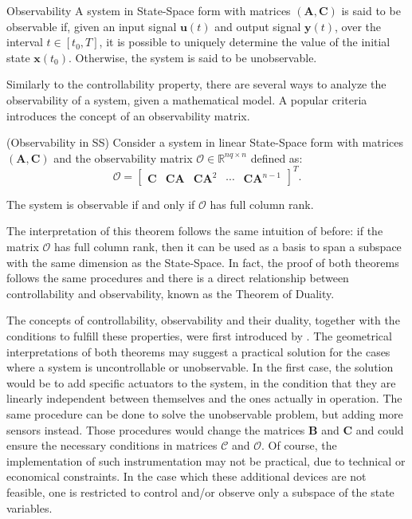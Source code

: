 \documentclass[a4paper,11pt]{book}
\numberwithin{figure}{chapter}
\numberwithin{equation}{chapter}
\numberwithin{table}{chapter}
\newtheorem{theorem}{Theorem}[chapter]
\theoremstyle{definition}
\newtheorem{definition}{Definition}[chapter]
\newcounter{boxed-theorem}
\newenvironment{boxed-theorem}[1]
{\colorlet{shadecolor}{pastelBlue2!5} \begin{shaded} \begin{theorem}{#1}}
{\end{theorem} \end{shaded}}
\newcounter{boxed-lemma}
\newcounter{boxed-definition}
\newenvironment{boxed-definition}[1]
{\colorlet{shadecolor}{pastelYellow!15} \begin{shaded} \begin{definition}{#1}}
{\end{definition} \end{shaded}}
\newcounter{boxed-example}
\begin{document}
\begin{boxed-definition}{Observability}
    A system in State-Space form with matrices $(\bm{A}, \bm{C})$ is said to be observable if, given an input signal $\bm{u}(t)$ and output signal $\bm{y}(t)$, over the interval $t \in [t_0, T]$, it is possible to uniquely determine the value of the initial state $\bm{x}(t_0)$. Otherwise, the system is said to be unobservable.
\end{boxed-definition}

Similarly to the controllability property, there are several ways to analyze the observability of a system, given a mathematical model. A popular criteria introduces the concept of an observability matrix.

\begin{boxed-theorem}{(Observability in SS)}
    Consider a system in linear State-Space form with matrices $(\bm{A}, \bm{C})$ and the observability matrix $\bm{\mathcal{O}} \in \mathbb{R}^{nq \times n}$ defined as:
    \begin{equation}
        \bm{\mathcal{O}} = \begin{bmatrix} \bm{C} & \bm{C} \bm{A} & \bm{C} \bm{A}^2 & \cdots & \bm{C} \bm{A}^{n-1} \end{bmatrix}^T
    .\end{equation}
    
    The system is observable if and only if $\bm{\mathcal{O}}$ has full column rank.
\end{boxed-theorem}   

The interpretation of this theorem follows the same intuition of before: if the matrix $\bm{\mathcal{O}}$ has full column rank, then it can be used as a basis to span a subspace with the same dimension as the State-Space. In fact, the proof of both theorems follows the same procedures and there is a direct relationship between controllability and observability, known as the Theorem of Duality.

The concepts of controllability, observability and their duality, together with the conditions to fulfill these properties, were first introduced by \cite{Kalman:1960}. The geometrical interpretations of both theorems may suggest a practical solution for the cases where a system is uncontrollable or unobservable. In the first case, the solution would be to add specific actuators to the system, in the condition that they are linearly independent between themselves and the ones actually in operation. The same procedure can be done to solve the unobservable problem, but adding more sensors instead. Those procedures would change the matrices $\bm{B}$ and $\bm{C}$ and could ensure the necessary conditions in matrices $\bm{\mathcal{C}}$ and $\bm{\mathcal{O}}$. Of course, the implementation of such instrumentation may not be practical, due to technical or economical constraints. In the case which these additional devices are not feasible, one is restricted to control and/or observe only a subspace of the state variables.
\end{document}
